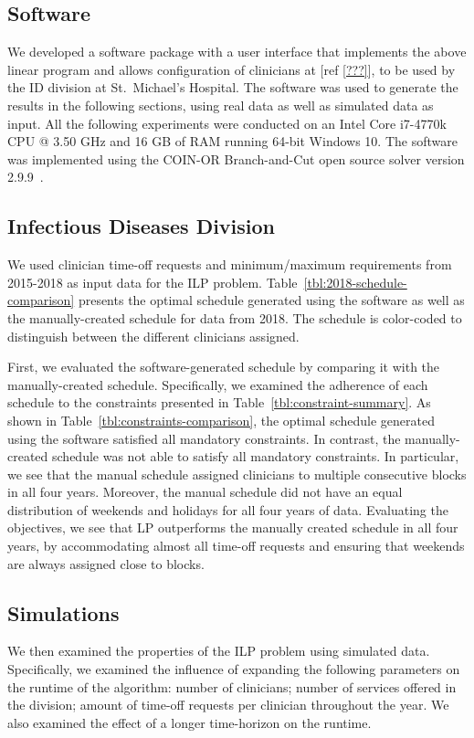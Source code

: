\subsection{Software}
We developed a software package with a user interface that implements the above
linear program and allows configuration of clinicians at [ref \ref{???}], to be
used by the ID division at St.\ Michael's Hospital. The software was used to
generate the results in the following sections, using real data as well as
simulated data as input. All the following experiments were conducted on an
Intel Core i7-4770k CPU @ 3.50 GHz and 16 GB of RAM running 64-bit Windows 10.
The software was implemented using the COIN-OR Branch-and-Cut open source solver
version 2.9.9~\cite{johnjforrest_coin-or/cbc:_2019}.

\subsection{Infectious Diseases Division}  %
We used clinician time-off requests and minimum/maximum requirements from
2015-2018 as input data for the ILP problem. Table~\ref{tbl:2018-schedule-comparison} presents the optimal schedule generated using
the software as well as the manually-created schedule for data from 2018. The
schedule is color-coded to distinguish between the different clinicians
assigned.



First, we evaluated the software-generated schedule by comparing it with the
manually-created schedule. Specifically, we examined the adherence of each
schedule to the constraints presented in Table~\ref{tbl:constraint-summary}. As
shown in Table~\ref{tbl:constraints-comparison}, the optimal schedule generated
using the software satisfied all mandatory constraints. In contrast, the
manually-created schedule was not able to satisfy all mandatory constraints. In
particular, we see that the manual schedule assigned clinicians to multiple
consecutive blocks in all four years. Moreover, the manual schedule did not have
an equal distribution of weekends and holidays for all four years of data.
Evaluating the objectives, we see that LP outperforms the manually created
schedule in all four years, by accommodating almost all time-off requests and
ensuring that weekends are always assigned close to blocks.



\subsection{Simulations}
We then examined the properties of the ILP problem using simulated data.
Specifically, we examined the influence of expanding the following parameters on
the runtime of the algorithm: number of clinicians; number of services offered
in the division; amount of time-off requests per clinician throughout the year.
We also examined the effect of a longer time-horizon on the runtime.

